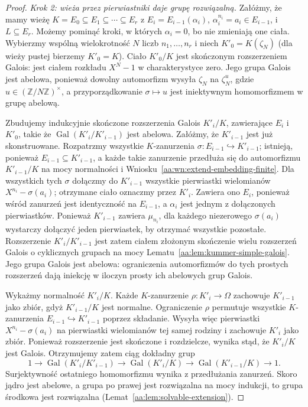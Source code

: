 \begin{proof}
\emph{Krok 2: wieża przez pierwiastniki daje grupę rozwiązalną.}
Załóżmy, że mamy wieżę
$K=E_0\subseteq E_1\subseteq\cdots\subseteq E_r$
z $E_i=E_{i-1}(\alpha_i)$, $\alpha_i^{n_i}=a_i\in E_{i-1}$,
i $L\subseteq E_r$. Możemy pominąć kroki, w których
$\alpha_i=0$, bo nie zmieniają one ciała.
Wybierzmy wspólną wielokrotność $N$ liczb $n_1,\ldots,n_r$
i niech $K'_0=K(\zeta_N)$ (dla wieży pustej bierzemy $K'_0=K$).
Ciało $K'_0/K$ jest skończonym rozszerzeniem Galois:
jest ciałem rozkładu $X^N-1$ w charakterystyce zero.
Jego grupa Galois jest abelowa, ponieważ dowolny automorfizm
wysyła $\zeta_N$ na $\zeta_N^u$, gdzie
$u\in(\mathbb Z/N\mathbb Z)^\times$, a przyporządkowanie
$\sigma\mapsto u$ jest iniektywnym homomorfizmem
w grupę abelową.

Zbudujemy indukcyjnie skończone rozszerzenia Galois
$K'_i/K$, zawierające $E_i$ i $K'_0$, takie że
$\operatorname{Gal}(K'_i/K'_{i-1})$ jest abelowa.
Załóżmy, że $K'_{i-1}$ jest już skonstruowane.
Rozpatrzmy wszystkie $K$-zanurzenia
$\sigma:E_{i-1}\hookrightarrow K'_{i-1}$;
istnieją, ponieważ $E_{i-1}\subseteq K'_{i-1}$,
a każde takie zanurzenie przedłuża się do automorfizmu
$K'_{i-1}/K$ na mocy normalności i
Wniosku~\ref{aa:wn:extend-embedding-finite}.
Dla wszystkich tych $\sigma$ dołączmy do $K'_{i-1}$
wszystkie pierwiastki wielomianów
$X^{n_i}-\sigma(a_i)$; otrzymane ciało oznaczmy
przez $K'_i$. Zawiera ono $E_i$, ponieważ wśród
zanurzeń jest identyczność na $E_{i-1}$, a $\alpha_i$
jest jednym z dołączonych pierwiastków.
Ponieważ $K'_{i-1}$ zawiera $\mu_{n_i}$, dla każdego
niezerowego $\sigma(a_i)$ wystarczy dołączyć jeden
pierwiastek, by otrzymać wszystkie pozostałe.
Rozszerzenie $K'_i/K'_{i-1}$ jest zatem ciałem złożonym
skończenie wielu rozszerzeń Galois o cyklicznych
grupach na mocy Lematu~\ref{aa:lem:kummer-simple-galois}.
Jego grupa Galois jest abelowa: ograniczenia
automorfizmów do tych prostych rozszerzeń dają
iniekcję w iloczyn prosty ich abelowych grup Galois.

Wykażmy normalność $K'_i/K$.
Każde $K$-zanurzenie $\rho:K'_i\to\Omega$
zachowuje $K'_{i-1}$ jako zbiór, gdyż
$K'_{i-1}/K$ jest normalne. Ograniczenie $\rho$
permutuje wszystkie $K$-zanurzenia
$E_{i-1}\hookrightarrow K'_{i-1}$ poprzez składanie.
Wysyła więc pierwiastki
$X^{n_i}-\sigma(a_i)$ na pierwiastki wielomianów
tej samej rodziny i zachowuje $K'_i$ jako zbiór.
Ponieważ rozszerzenie jest skończone i rozdzielcze,
wynika stąd, że $K'_i/K$ jest Galois.
Otrzymujemy zatem ciąg dokładny grup
\[
1\to\operatorname{Gal}(K'_i/K'_{i-1})
\to\operatorname{Gal}(K'_i/K)
\to\operatorname{Gal}(K'_{i-1}/K)\to1.
\]
Surjektywność ostatniego homomorfizmu wynika z
przedłużania zanurzeń. Skoro jądro jest abelowe,
a grupa po prawej jest rozwiązalna na mocy indukcji,
to grupa środkowa jest rozwiązalna
(Lemat~\ref{aa:lem:solvable-extension}).


\end{proof}
